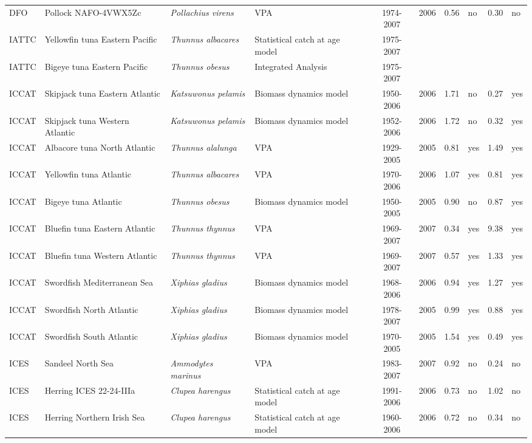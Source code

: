 \begin{longtable}{p{1.8cm}p{3.5cm}p{3.5cm}p{3cm}cccp{0.9cm}cp{0.9cm}}
  DFO & Pollock NAFO-4VWX5Zc & \textit{Pollachius virens} & VPA & 1974-2007 & 2006 & 0.56 & no & 0.30 & no \\ 
  IATTC & Yellowfin tuna Eastern Pacific & \textit{Thunnus albacares} & Statistical catch at age model & 1975-2007 &  &  &  &  &  \\ 
  IATTC & Bigeye tuna Eastern Pacific & \textit{Thunnus obesus} & Integrated Analysis & 1975-2007 &  &  &  &  &  \\ 
  ICCAT & Skipjack tuna Eastern Atlantic & \textit{Katsuwonus pelamis} & Biomass dynamics model & 1950-2006 & 2006 & 1.71 & no & 0.27 & yes \\ 
  ICCAT & Skipjack tuna Western Atlantic & \textit{Katsuwonus pelamis} & Biomass dynamics model & 1952-2006 & 2006 & 1.72 & no & 0.32 & yes \\ 
  ICCAT & Albacore tuna North Atlantic & \textit{Thunnus alalunga} & VPA & 1929-2005 & 2005 & 0.81 & yes & 1.49 & yes \\ 
  ICCAT & Yellowfin tuna Atlantic & \textit{Thunnus albacares} & VPA & 1970-2006 & 2006 & 1.07 & yes & 0.81 & yes \\ 
  ICCAT & Bigeye tuna Atlantic & \textit{Thunnus obesus} & Biomass dynamics model & 1950-2005 & 2005 & 0.90 & no & 0.87 & yes \\ 
  ICCAT & Bluefin tuna Eastern Atlantic & \textit{Thunnus thynnus} & VPA & 1969-2007 & 2007 & 0.34 & yes & 9.38 & yes \\ 
  ICCAT & Bluefin tuna Western Atlantic & \textit{Thunnus thynnus} & VPA & 1969-2007 & 2007 & 0.57 & yes & 1.33 & yes \\ 
  ICCAT & Swordfish Mediterranean Sea & \textit{Xiphias gladius} & Biomass dynamics model & 1968-2006 & 2006 & 0.94 & yes & 1.27 & yes \\ 
  ICCAT & Swordfish North Atlantic & \textit{Xiphias gladius} & Biomass dynamics model & 1978-2007 & 2005 & 0.99 & yes & 0.88 & yes \\ 
  ICCAT & Swordfish South Atlantic & \textit{Xiphias gladius} & Biomass dynamics model & 1970-2005 & 2005 & 1.54 & yes & 0.49 & yes \\ 
  ICES & Sandeel North Sea & \textit{Ammodytes marinus} & VPA & 1983-2007 & 2007 & 0.92 & no & 0.24 & no \\ 
  ICES & Herring ICES 22-24-IIIa & \textit{Clupea harengus} & Statistical catch at age model & 1991-2006 & 2006 & 0.73 & no & 1.02 & no \\ 
  ICES & Herring Northern Irish Sea & \textit{Clupea harengus} & Statistical catch at age model & 1960-2006 & 2006 & 0.72 & no & 0.34 & no \\ 

\end{longtable}
